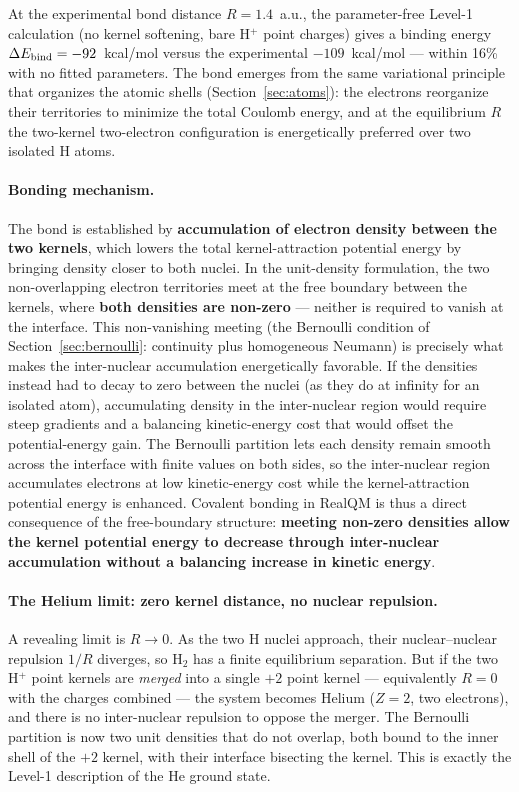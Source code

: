 \documentclass[11pt]{article}
\begin{document}
At the experimental bond distance $R = 1.4$~a.u., the parameter-free Level-1 calculation (no kernel softening, bare H$^+$ point charges) gives a binding energy $\Delta E_{\rm bind} = -92$~kcal/mol versus the experimental $-109$~kcal/mol --- within 16\% with no fitted parameters. The bond emerges from the same variational principle that organizes the atomic shells (Section~\ref{sec:atoms}): the electrons reorganize their territories to minimize the total Coulomb energy, and at the equilibrium $R$ the two-kernel two-electron configuration is energetically preferred over two isolated H atoms.

\paragraph{Bonding mechanism.}
The bond is established by \textbf{accumulation of electron density between the two kernels}, which lowers the total kernel-attraction potential energy by bringing density closer to both nuclei. In the unit-density formulation, the two non-overlapping electron territories meet at the free boundary between the kernels, where \textbf{both densities are non-zero} --- neither is required to vanish at the interface. This non-vanishing meeting (the Bernoulli condition of Section~\ref{sec:bernoulli}: continuity plus homogeneous Neumann) is precisely what makes the inter-nuclear accumulation energetically favorable. If the densities instead had to decay to zero between the nuclei (as they do at infinity for an isolated atom), accumulating density in the inter-nuclear region would require steep gradients and a balancing kinetic-energy cost that would offset the potential-energy gain. The Bernoulli partition lets each density remain smooth across the interface with finite values on both sides, so the inter-nuclear region accumulates electrons at low kinetic-energy cost while the kernel-attraction potential energy is enhanced. Covalent bonding in RealQM is thus a direct consequence of the free-boundary structure: \textbf{meeting non-zero densities allow the kernel potential energy to decrease through inter-nuclear accumulation without a balancing increase in kinetic energy}.

\paragraph{The Helium limit: zero kernel distance, no nuclear repulsion.}
A revealing limit is $R \to 0$. As the two H nuclei approach, their nuclear--nuclear repulsion $1/R$ diverges, so H$_2$ has a finite equilibrium separation. But if the two H$^+$ point kernels are \emph{merged} into a single $+2$ point kernel --- equivalently $R = 0$ with the charges combined --- the system becomes Helium ($Z = 2$, two electrons), and there is no inter-nuclear repulsion to oppose the merger. The Bernoulli partition is now two unit densities that do not overlap, both bound to the inner shell of the $+2$ kernel, with their interface bisecting the kernel. This is exactly the Level-1 description of the He ground state.
\end{document}
